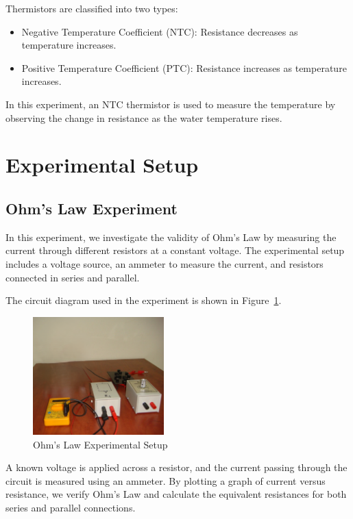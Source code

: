 \documentclass[journal]{IEEEtran}
\begin{document}
Thermistors are classified into two types:
\begin{itemize}
    \item Negative Temperature Coefficient (NTC): Resistance decreases as temperature increases.
    \item Positive Temperature Coefficient (PTC): Resistance increases as temperature increases.
\end{itemize}

In this experiment, an NTC thermistor is used to measure the temperature by observing the change in resistance as the water temperature rises.

\section{Experimental Setup}
\subsection{Ohm's Law Experiment}
In this experiment, we investigate the validity of Ohm’s Law by measuring the current through different resistors at a constant voltage. The experimental setup includes a voltage source, an ammeter to measure the current, and resistors connected in series and parallel.

The circuit diagram used in the experiment is shown in Figure~\ref{fig:ohmslaw}.

\begin{figure}[H]
    \centering
    \includegraphics[width=0.45\textwidth]{IMAGES/Ohms_Law_Setup_only.png} %
    \caption{Ohm's Law Experimental Setup}
    \label{fig:ohmslaw}
\end{figure}

A known voltage is applied across a resistor, and the current passing through the circuit is measured using an ammeter. By plotting a graph of current versus resistance, we verify Ohm’s Law and calculate the equivalent resistances for both series and parallel connections.
\end{document}
